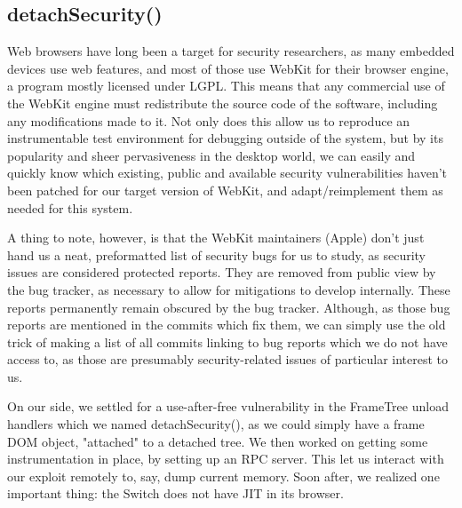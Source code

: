 \documentclass[journal]{IEEEtran}
\begin{document}
\subsection{detachSecurity()}

Web browsers have long been a target for security researchers, as many embedded
devices use web features, and most of those use WebKit for their browser engine, a program
mostly licensed under LGPL. This means that any commercial use of the WebKit engine must
redistribute the source code of the software, including any modifications made to it.
Not only does this allow us to reproduce an instrumentable test environment for debugging
outside of the system, but by its popularity and sheer pervasiveness in the desktop world,
we can easily and quickly know which existing, public and available security vulnerabilities
haven't been patched for our target version of WebKit, and adapt/reimplement them as needed for
this system.

A thing to note, however, is that the WebKit maintainers (Apple) don't just hand us a neat,
preformatted list of security bugs for us to study, as security issues are considered
protected reports. They are removed from public view by the bug tracker, as necessary to allow
for mitigations to develop internally. These reports permanently remain obscured by the bug tracker.
Although, as those bug reports are mentioned in the commits which fix them, we can simply use the
old trick \cite{wiiu} of making a list of all commits linking to bug reports which we do not have
access to, as those are presumably security-related issues of particular interest to us.

On our side, we settled for a use-after-free vulnerability in the FrameTree unload handlers
\cite{detach_vuln} which we named detachSecurity(), as we could simply have a frame DOM object,
"attached" to a detached tree. We then worked on getting some instrumentation in place, by setting
up an RPC server. This let us interact with our exploit remotely to, say, dump current memory.
Soon after, we realized one important thing: the Switch does not have JIT in its browser.
\end{document}

